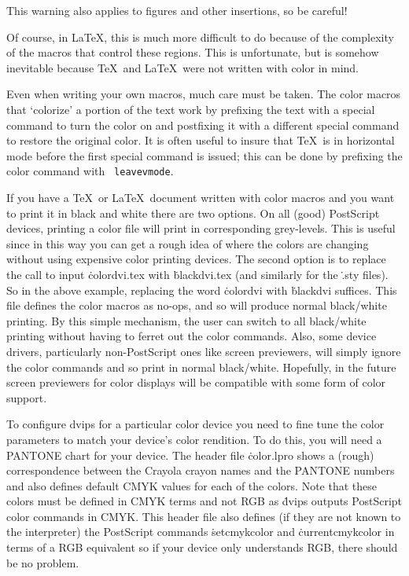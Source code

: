 This warning also applies to figures and other insertions, so be
careful!

Of course, in La\TeX, this is much more difficult to do because of the
complexity of the macros that control these regions.  This is
unfortunate, but is somehow inevitable because \TeX\ and La\TeX\ were
not written with color in mind.

Even when writing your own macros, much care must be taken.  The
color macros that `colorize' a portion of the text work by prefixing
the text with a special command to turn the color on and postfixing it
with a different special command to restore the original color.
It is often useful to insure that \TeX\ is in horizontal mode before
the first special command is issued; this can be done by prefixing the
color command with {\tt{} leavevmode}.


If you have a \TeX\ or La\TeX\ document written with color macros and
you want to print it in black and white there are two options.  On all
(good) PostScript devices, printing a color file will print in
corresponding grey-levels.  This is useful since in this way you can
get a rough idea of where the colors are changing without using
expensive color printing devices.  The second option is to replace the
call to input \.{colordvi.tex} with \.{blackdvi.tex} (and similarly for the
\.{.sty} files).  So in the above example, replacing the word
\.{colordvi} with \.{blackdvi} suffices.  This file defines the color macros
as no-ops, and so will produce normal black/white printing.  By this
simple mechanism, the user can switch to all black/white printing
without having to ferret out the color commands.  Also, some device
drivers, particularly non-PostScript ones like screen previewers, will
simply ignore the color commands and so print in normal black/white.
Hopefully, in the future screen previewers for color displays will be
compatible with some form of color support.


To configure dvips for a particular color device you need to fine tune
the color parameters to match your device's color rendition.  To do
this, you will need a PANTONE chart for your device.  The header file
\.{color.lpro} shows a (rough) correspondence between the Crayola
crayon names and the PANTONE numbers and also defines default CMYK
values for each of the colors.  Note that these colors must be defined
in CMYK terms and not RGB as \.{dvips} outputs PostScript color
commands in CMYK.  This header file also defines (if they are not
known to the interpreter) the PostScript commands \.{setcmykcolor} and
\.{currentcmykcolor} in terms of a RGB equivalent so if your device
only understands RGB, there should be no problem.

